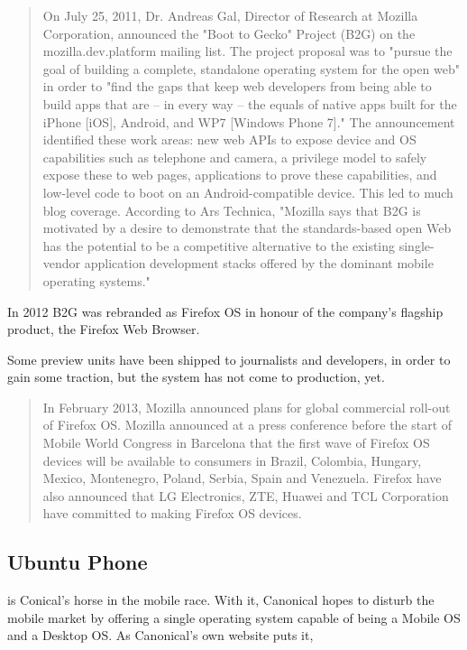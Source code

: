 \begin{quotation}
On July 25, 2011, Dr. Andreas Gal, Director of Research at Mozilla Corporation, announced the "Boot to Gecko" Project (B2G) on the mozilla.dev.platform mailing list. The project proposal was to "pursue the goal of building a complete, standalone operating system for the open web" in order to "find the gaps that keep web developers from being able to build apps that are – in every way – the equals of native apps built for the iPhone [iOS], Android, and WP7 [Windows Phone 7]." The announcement identified these work areas: new web APIs to expose device and OS capabilities such as telephone and camera, a privilege model to safely expose these to web pages, applications to prove these capabilities, and low-level code to boot on an Android-compatible device.
This led to much blog coverage. According to Ars Technica, "Mozilla says that B2G is motivated by a desire to demonstrate that the standards-based open Web has the potential to be a competitive alternative to the existing single-vendor application development stacks offered by the dominant mobile operating systems."
\cite{wikipedia:firefox}
\end{quotation}

In 2012 B2G was rebranded as Firefox OS in honour of the company's flagship product, the Firefox Web Browser.


Some preview units have been shipped to journalists and developers, in order to gain some traction, but the system has not come to production, yet. 

\begin{quotation}
In February 2013, Mozilla announced plans for global commercial roll-out of Firefox OS. Mozilla announced at a press conference before the start of Mobile World Congress in Barcelona that the first wave of Firefox OS devices will be available to consumers in Brazil, Colombia, Hungary, Mexico, Montenegro, Poland, Serbia, Spain and Venezuela. Firefox have also announced that LG Electronics, ZTE, Huawei and TCL Corporation have committed to making Firefox OS devices.
\cite{wikipedia:firefox}
\end{quotation}

 

\subsection{Ubuntu Phone}
 is Conical's horse in the mobile race. With it, Canonical hopes to disturb the mobile market by offering a single operating system capable of being a Mobile OS and a Desktop OS. As Canonical's own website puts it, 

